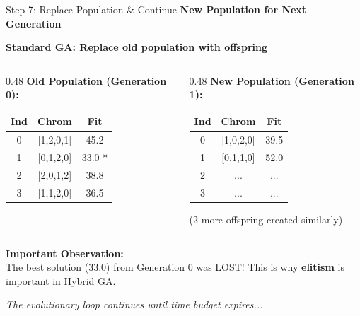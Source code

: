 \documentclass[aspectratio=169,10pt]{beamer}
\begin{document}
\begin{frame}{Step 7: Replace Population \& Continue}
  \colorbox{navymid}{\color{teallt}\bfseries New Population for Next Generation}
  
  \vspace{0.3cm}
  \textbf{Standard GA: Replace old population with offspring}
  
  \vspace{0.2cm}
  \begin{columns}[T]
    \begin{column}{0.48\textwidth}
      \textbf{Old Population (Generation 0):}
      
      \vspace{0.2cm}
      \begin{tabular}{ccc}
        \toprule
        \rowcolor{navymid}
        \color{white}\textbf{Ind} & \color{white}\textbf{Chrom} & \color{white}\textbf{Fit} \\
        \midrule
        0 & [1,2,0,1] & 45.2 \\
        1 & [0,1,2,0] & 33.0 * \\
        2 & [2,0,1,2] & 38.8 \\
        3 & [1,1,2,0] & 36.5 \\
        \bottomrule
      \end{tabular}
    \end{column}
    
    \begin{column}{0.48\textwidth}
      \textbf{New Population (Generation 1):}
      
      \vspace{0.2cm}
      \begin{tabular}{ccc}
        \toprule
        \rowcolor{navymid}
        \color{white}\textbf{Ind} & \color{white}\textbf{Chrom} & \color{white}\textbf{Fit} \\
        \midrule
        0 & [1,0,2,0] & 39.5 \\
        1 & [0,1,1,0] & 52.0 \\
        2 & ... & ... \\
        3 & ... & ... \\
        \bottomrule
      \end{tabular}
      
      {\scriptsize (2 more offspring created similarly)}
    \end{column}
  \end{columns}
  
  \vspace{0.3cm}
  \colorbox{amber}{\begin{minipage}{\linewidth}
    {\color{white}\small\bfseries Important Observation:}\\
    {\color{white}\scriptsize The best solution (33.0) from Generation 0 was LOST! This is why \textbf{elitism} is important in Hybrid GA.}
  \end{minipage}}
  
  \vspace{0.2cm}
  {\small\textit{The evolutionary loop continues until time budget expires...}}
\end{frame}
\end{document}
